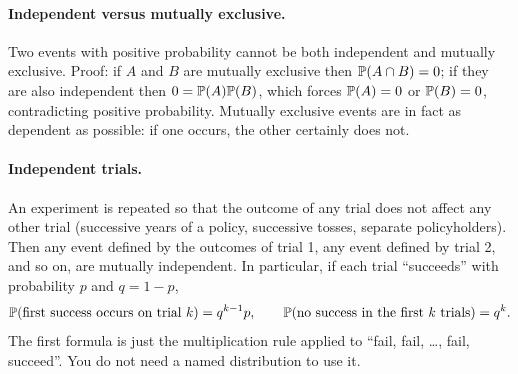 \paragraph{Independent versus mutually exclusive.}
Two events with positive probability cannot be both independent and mutually exclusive. Proof: if $A$ and $B$ are mutually exclusive then $\mathbb{P}(A \cap B) = 0$; if they are also independent then $0 = \mathbb{P}(A)\mathbb{P}(B)$, which forces $\mathbb{P}(A) = 0$ or $\mathbb{P}(B) = 0$, contradicting positive probability. Mutually exclusive events are in fact as dependent as possible: if one occurs, the other certainly does not.

\paragraph{Independent trials.}
An experiment is repeated so that the outcome of any trial does not affect any other trial (successive years of a policy, successive tosses, separate policyholders). Then any event defined by the outcomes of trial 1, any event defined by trial 2, and so on, are mutually independent. In particular, if each trial ``succeeds'' with probability $p$ and $q = 1 - p$,
\[
\mathbb{P}(\text{first success occurs on trial } k) = q^{k-1} p, \qquad
\mathbb{P}(\text{no success in the first } k \text{ trials}) = q^{k}.
\]
The first formula is just the multiplication rule applied to ``fail, fail, \dots, fail, succeed''. You do not need a named distribution to use it.

